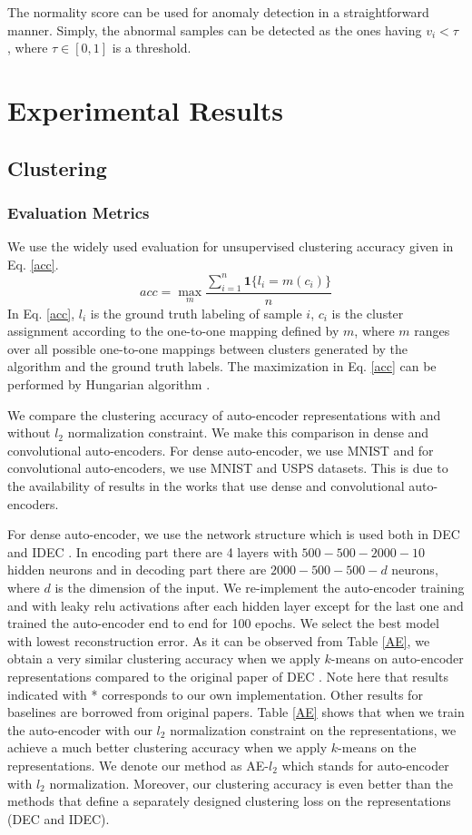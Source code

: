 \documentclass[conference]{IEEEtran}
\begin{document}
The normality score can be used for anomaly detection in a straightforward manner.
Simply, the abnormal samples can be detected as the ones having $v_i<\tau$ , where $\tau \in [0,1]$ is a threshold.


\section{Experimental Results}
\subsection{Clustering}

\subsubsection*{Evaluation Metrics}
We use the widely used evaluation for unsupervised clustering accuracy \cite{DEC} given in Eq. \ref{acc}.
\begin{equation}
\label{acc}
acc=\max_m \frac{\sum_{i=1}^n \pmb{1} \{l_i=m(c_i) \}}{n}
\end{equation}
In Eq. \ref{acc}, $l_i$ is the ground truth labeling of sample $i$, $c_i$ is the cluster assignment according to the one-to-one mapping defined by $m$, where $m$ ranges over all possible one-to-one mappings between clusters generated by the algorithm and the ground truth labels.
The maximization in Eq. \ref{acc} can be performed by Hungarian algorithm \cite{HUN}.

We compare the clustering accuracy of auto-encoder representations with and without $l_2$ normalization constraint.
We make this comparison in dense and convolutional auto-encoders.
For dense auto-encoder, we use MNIST \cite{MNIST} and for convolutional auto-encoders, we use MNIST \cite{MNIST} and USPS \cite{USPS} datasets. 
This is due to the availability of results in the works that use dense and convolutional auto-encoders.

For dense auto-encoder, we use the network structure which is used both in DEC \cite{DEC} and IDEC \cite{IDEC}. 
In encoding part there are 4 layers with $500-500-2000-10$ hidden neurons and in decoding part there are $2000-500-500-d$ neurons, where $d$ is the dimension of the input. 
We re-implement the auto-encoder training and with leaky relu \cite{LRELU} activations after each hidden layer except for the last one and trained the auto-encoder end to end for 100 epochs. 
We select the best model with lowest reconstruction error.
As it can be observed from Table \ref{AE}, we obtain a very similar clustering accuracy when we apply $k$-means on auto-encoder representations compared to the original paper of DEC \cite{DEC}. 
Note here that results indicated with * corresponds to our own implementation.
Other results for baselines are borrowed from original papers.
Table \ref{AE} shows that when we train the auto-encoder with our $l_2$ normalization constraint on the representations, we achieve a much better clustering accuracy when we apply $k$-means on the representations. 
We denote our method as AE-$l_2$ which stands for auto-encoder with $l_2$ normalization.
Moreover, our clustering accuracy is even better than the methods that define a separately designed clustering loss on the representations (DEC and IDEC).
\end{document}
